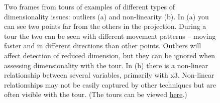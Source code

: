 \documentclass[
  letterpaper,
]{krantz}
\begin{document}
\begin{figure}

\begin{minipage}[t]{0.50\linewidth}

{\centering 


}

\end{minipage}%
%
\begin{minipage}[t]{0.50\linewidth}

{\centering 


}

\end{minipage}%

\caption{\label{fig-outlier-nonlin-pdf}Two frames from tours of examples
of different types of dimensionality issues: outliers (a) and
non-linearity (b). In (a) you can see two points far from the others in
the projection. During a tour the two can be seen with different
movement patterns -- moving faster and in different directions than
other points. Outliers will affect detection of reduced dimension, but
they can be ignored when assessing dimensionality with the tour. In (b)
there is a non-linear relationship between several variables, primarily
with x3. Non-linear relationships may not be easily captured by other
techniques but are often visible with the tour. (The tours can be viewed
\href{https://dicook.github.io/mulgar_book/3-intro-dimred.html}{here}.)}

\end{figure}
\end{document}
